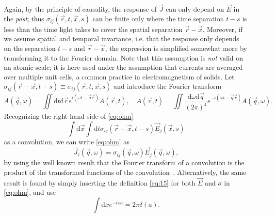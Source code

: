 Again, by the principle of causality, the response of $\vec{J}$ can only depend on $\vec{E}$ in the \emph{past};
thus $\sigma_{ij}(\vec{r}, t, \vec{x}, s)$ can be finite only where the time separation $t-s$ is less than the time light takes to cover the spatial separation $\vec{r} - \vec{x}$.
Moreover, if we assume spatial and temporal invariance, i.e. that the response only depends on the separation $t-s$ and $\vec{r} - \vec{x}$, the expression is simplified somewhat more by transforming it to the Fourier domain.
Note that this assumption is \emph{not} valid on an atomic scale;
it is here used under the assumption that currents are averaged over multiple unit cells, a common practice in electromagnetism of solids.
Let $\sigma_{ij}(\vec{r} - \vec{x}, t-s) \equiv \sigma_{ij}(\vec{r}, t, \vec{x}, s)$ and introduce the Fourier transform
\begin{equation}
  \label{eq:15}
  A(\vec{q}, \omega ) =
  \iint \mathrm{d}t \mathrm{d} \vec{r}
  e^{i(\omega  t - \vec{q} \vec{r} )}
  A(\vec{r}, t),
  \quad
  A(\vec{r}, t) =
  \iint 
  \frac{\mathrm{d}\omega  \mathrm{d} \vec{q}}{(2\pi )^4}
  e^{-i(\omega  t - \vec{q} \vec{r} )}
  A(\vec{q}, \omega).
\end{equation}
Recognizing the right-hand side of \cref{eq:ohm}
\begin{equation}
  \int \mathrm{d} \vec{x} \int \mathrm{d} t
  \sigma _{ij} (\vec{r}-\vec{x}, t-s ) \vec{E}_{j}(\vec{x}, s)
\end{equation}
as a convolution, we can write \cref{eq:ohm} as
\begin{equation}
\label{eq:ohm-fourier}
  \vec{J}_i(\vec{q}, \omega) =
  \sigma_{ij}(\vec{q}, \omega)
  \vec{E}_j(\vec{q}, \omega),
\end{equation}
by using the well known result that the Fourier transform of a convolution is the product of the transformed functions of the convolution~\cite{rottmannMatematiskFormelsamling1995}.
Alternatively, the same result is found by simply inserting the definition \cref{eq:15} for both $\vec{E}$ and $\sigma $ in \cref{eq:ohm}, and use
\[
\int \mathrm{d} x e^{-i x a} = 2\pi \delta (a).
  \]

